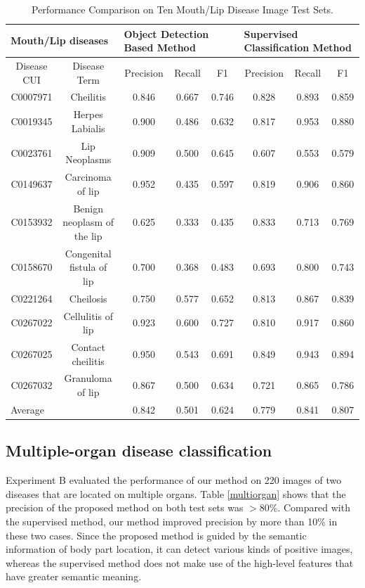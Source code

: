 \setlength{\tabcolsep}{5.7pt}
\begin{table}
\centering
\caption{Performance Comparison on Ten Mouth/Lip Disease Image Test Sets.}\label{mouthres}
\renewcommand{\arraystretch}{1.3}
\begin{tabular}{cccccccc}
\hline
\multicolumn{2}{l}{Mouth/Lip diseases} & \multicolumn{3}{l}{Object Detection Based Method} &
\multicolumn{3}{l}{Supervised Classification Method} \\ \hline
Disease CUI    &Disease Term & Precision & Recall & F1    & Precision & Recall & F1 \\ \hline
C0007971	&Cheilitis	&0.846&	0.667&	0.746	&0.828&	0.893	&0.859\\ \hline
C0019345	&Herpes Labialis&0.900	&0.486	&0.632	&0.817	&0.953&	0.880\\ \hline
C0023761	&Lip Neoplasms	&0.909	&0.500	&0.645	&0.607	&0.553	&0.579\\ \hline
C0149637	&Carcinoma of lip	&0.952	&0.435	&0.597&	0.819	&0.906	&0.860\\ \hline
C0153932	&Benign neoplasm of the lip	&0.625	&0.333	&0.435	&0.833&	0.713	&0.769\\ \hline
C0158670	&Congenital fistula of lip	&0.700	&0.368&	0.483	&0.693	&0.800	&0.743\\ \hline
C0221264	&Cheilosis	&0.750	&0.577	&0.652	&0.813	&0.867	&0.839\\ \hline
C0267022	&Cellulitis of lip	&0.923	&0.600	&0.727	&0.810	&0.917	&0.860\\ \hline
C0267025	&Contact cheilitis	&0.950&	0.543	&0.691	&0.849	&0.943	&0.894\\ \hline
C0267032	&Granuloma of lip	&0.867	&0.500	&0.634&	0.721	&0.865&	0.786\\ \hline
\multicolumn{2}{l}{Average}&0.842	&0.501	&0.624&	0.779&	0.841	&0.807 \\ \hline
\end{tabular}
\end{table}

\subsection{Multiple-organ disease classification}
Experiment B evaluated the performance of our method on 220
images of two diseases that are located on multiple organs.
Table {\ref{multiorgan}} shows that the precision of the proposed method on
both test sets was $>80\%$. Compared with the supervised
method, our method improved precision by more than 10\% in
these two cases. Since the proposed method is guided by the
semantic information of body part location, it can detect
various kinds of positive images, whereas the supervised method
does not make use of the high-level features that have greater
semantic meaning.

